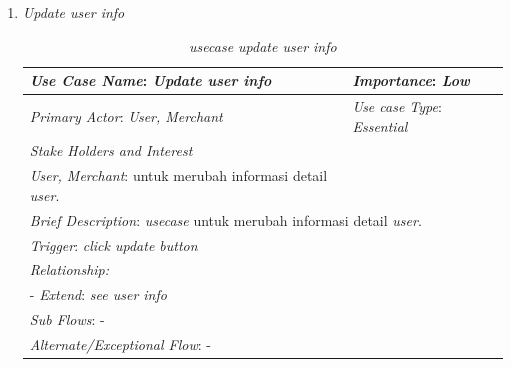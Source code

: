 \documentclass[a4paper]{article}
\begin{document}
\begin{enumerate}
\begin{enumerate}
        \item \textit{Update user info}
        \begin{table}[h]
            \centering
            \begin{tabular}{|lll}
            \hline
            \multicolumn{1}{|l|}{\textit{Use Case Name}: \textit{Update user info}}             & \multicolumn{2}{l|}{\textit{Importance}: \textit{Low}}   \\ \hline
            \multicolumn{1}{|l|}{\textit{Primary Actor}: \textit{User, Merchant}}             & \multicolumn{2}{l|}{\textit{Use case Type}: \textit{Essential}} \\ \hline
            \multicolumn{1}{|l|}{\textit{Stake Holders and Interest}} &                               &                               \\ \cline{1-1}
            \multicolumn{1}{|l|}{\textit{User, Merchant}: untuk merubah informasi detail \textit{user}.}                                                     &                               &                               \\ \hline
            \multicolumn{3}{|l|}{\textit{Brief Description}: \textit{usecase} untuk merubah informasi detail \textit{user}.}                                                                         \\ \hline
            \multicolumn{3}{|l|}{\textit{Trigger}: \textit{click update button}}                                                                                   \\ \hline
            \multicolumn{3}{|l|}{\textit{Relationship:}}                                                                              \\ \hline
            \multicolumn{3}{|l|}{- \textit{Extend}: \textit{see user info}}                                                                                                                     \\ \hline
            \multicolumn{3}{|l|}{\textit{Sub Flows}: -}                                                                                 \\ \hline
            \multicolumn{3}{|l|}{\textit{Alternate/Exceptional Flow}: -}                                                                \\ \hline
            \end{tabular}
            \caption{\textit{usecase update user info} }
        \end{table}


\end{enumerate}
\end{enumerate}
\end{document}
